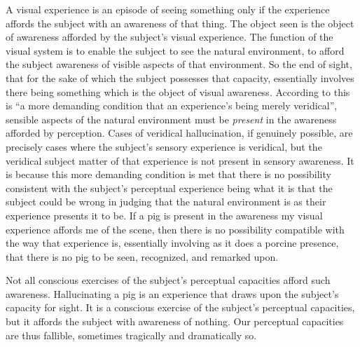 \documentclass[12pt]{article}
\begin{document}
A visual experience is an episode of seeing something only if the experience affords the subject with an awareness of that thing. The object seen is the object of awareness afforded by the subject's visual experience. The function of the visual system is to enable the subject to see the natural environment, to afford the subject awareness of visible aspects of that environment. So the end of sight, that for the sake of which the subject possesses that capacity, essentially involves there being something which is the object of visual awareness. According to \citet[245]{McDowell:2010fk} this is ``a more demanding condition that an experience's being merely veridical'', sensible aspects of the natural environment must be \emph{present} in the awareness afforded by perception. Cases of veridical hallucination, if genuinely possible, are precisely cases where the subject's sensory experience is veridical, but the veridical subject matter of that experience is not present in sensory awareness. It is because this more demanding condition is met that there is no possibility consistent with the subject's perceptual experience being what it is that the subject could be wrong in judging that the natural environment is as their experience presents it to be. If a pig is present in the awareness my visual experience affords me of the scene, then there is no possibility compatible with the way that experience is, essentially involving as it does a porcine presence, that there is no pig to be seen, recognized, and remarked upon.

Not all conscious exercises of the subject's perceptual capacities afford such awareness. Hallucinating a pig is an experience that draws upon the subject's capacity for sight. It is a conscious exercise of the subject's perceptual capacities, but it affords the subject with awareness of nothing. Our perceptual capacities are thus fallible, sometimes tragically and dramatically so. 
\end{document}
